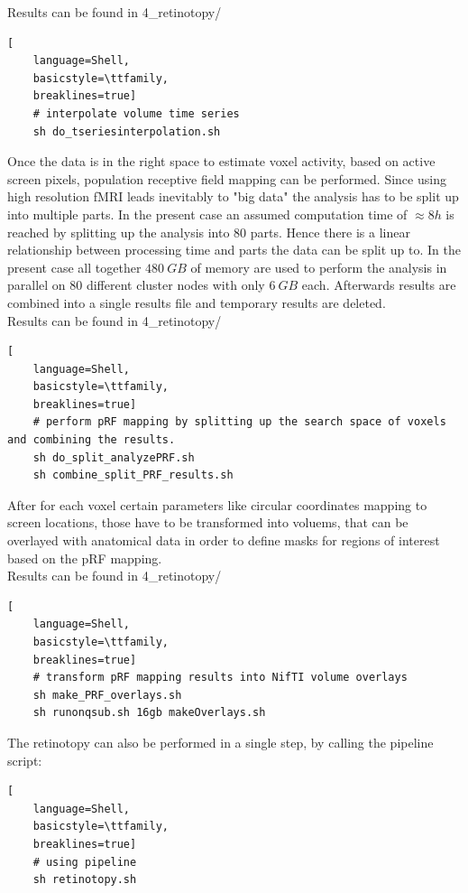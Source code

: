 \documentclass[12pt,a4paper]{scrartcl}
\begin{document}
\noindent Results can be found in 4\_retinotopy/\\
\begin{lstlisting}[
    language=Shell,
    basicstyle=\ttfamily,
    breaklines=true]
    # interpolate volume time series
    sh do_tseriesinterpolation.sh
\end{lstlisting}
Once the data is in the right space to estimate voxel activity, based on active screen pixels, population receptive field mapping can be performed. Since using high resolution fMRI leads inevitably to "big data" the analysis has to be split up into multiple parts. In the present case an assumed computation time of $\approx 8h$ is reached by splitting up the analysis into 80 parts. Hence there is a linear relationship between processing time and parts the data can be split up to. In the present case all together $480~GB$ of memory are used to perform the analysis in parallel on 80 different cluster nodes with only $6~GB$ each. Afterwards results are combined into a single results file and temporary results are deleted.\\

\noindent Results can be found in 4\_retinotopy/\\
\begin{lstlisting}[
    language=Shell,
    basicstyle=\ttfamily,
    breaklines=true]
    # perform pRF mapping by splitting up the search space of voxels and combining the results.
    sh do_split_analyzePRF.sh
    sh combine_split_PRF_results.sh
\end{lstlisting}
After for each voxel certain parameters like circular coordinates mapping to screen locations, those have to be transformed into voluems, that can be overlayed with anatomical data in order to define masks for regions of interest based on the pRF mapping.\\

\noindent Results can be found in 4\_retinotopy/\\
\begin{lstlisting}[
    language=Shell,
    basicstyle=\ttfamily,
    breaklines=true]
    # transform pRF mapping results into NifTI volume overlays
    sh make_PRF_overlays.sh
    sh runonqsub.sh 16gb makeOverlays.sh
\end{lstlisting}
The retinotopy can also be performed in a single step, by calling the pipeline script:
\begin{lstlisting}[
    language=Shell,
    basicstyle=\ttfamily,
    breaklines=true]
    # using pipeline
    sh retinotopy.sh
\end{lstlisting}
\end{document}
